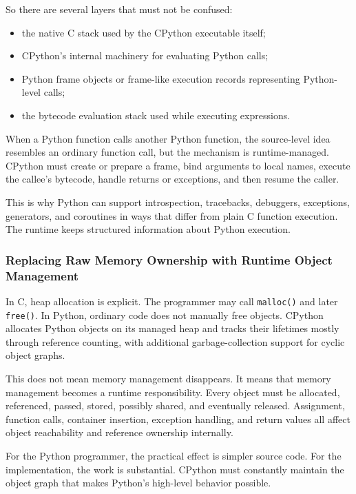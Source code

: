 So there are several layers that must not be confused:

\begin{itemize}
    \item the native C stack used by the CPython executable itself;
    \item CPython's internal machinery for evaluating Python calls;
    \item Python frame objects or frame-like execution records representing Python-level calls;
    \item the bytecode evaluation stack used while executing expressions.
\end{itemize}

When a Python function calls another Python function, the source-level idea resembles an ordinary function call, but the mechanism is runtime-managed. CPython must create or prepare a frame, bind arguments to local names, execute the callee's bytecode, handle returns or exceptions, and then resume the caller.

This is why Python can support introspection, tracebacks, debuggers, exceptions, generators, and coroutines in ways that differ from plain C function execution. The runtime keeps structured information about Python execution.

\subsubsection{Replacing Raw Memory Ownership with Runtime Object Management}

In C, heap allocation is explicit. The programmer may call \texttt{malloc()} and later \texttt{free()}. In Python, ordinary code does not manually free objects. CPython allocates Python objects on its managed heap and tracks their lifetimes mostly through reference counting, with additional garbage-collection support for cyclic object graphs.

This does not mean memory management disappears. It means that memory management becomes a runtime responsibility. Every object must be allocated, referenced, passed, stored, possibly shared, and eventually released. Assignment, function calls, container insertion, exception handling, and return values all affect object reachability and reference ownership internally.

For the Python programmer, the practical effect is simpler source code. For the implementation, the work is substantial. CPython must constantly maintain the object graph that makes Python's high-level behavior possible.

